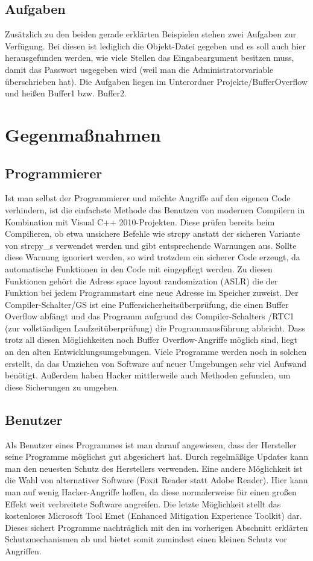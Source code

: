 \subsection{Aufgaben}
Zusätzlich zu den beiden gerade erklärten Beispielen stehen zwei Aufgaben zur Verfügung. Bei diesen ist lediglich die Objekt-Datei gegeben und es soll auch hier herausgefunden werden, wie viele Stellen das Eingabeargument besitzen muss, damit das Passwort  usgegeben wird (weil man die Administratorvariable
überschrieben hat).
Die Aufgaben liegen im Unterordner Projekte/BufferOverflow und heißen Buffer1 bzw. Buffer2.

\section{Gegenmaßnahmen}

\subsection{Programmierer}
Ist man selbst der Programmierer und möchte Angriffe auf den eigenen Code verhindern, ist die einfachste Methode das Benutzen von modernen Compilern in Kombination mit Visual C++ 2010-Projekten.
Diese prüfen bereits beim Compilieren, ob etwa unsichere Befehle wie strcpy anstatt der sicheren Variante von strcpy\_s verwendet werden und gibt entsprechende Warnungen aus. 
Sollte diese Warnung ignoriert werden, so wird trotzdem ein sicherer Code erzeugt, da automatische Funktionen in den Code mit eingepflegt werden. 
Zu diesen Funktionen gehört die Adress space layout randomization (ASLR) die der Funktion bei jedem Programmstart eine neue Adresse im Speicher zuweist. 
Der Compiler-Schalter/GS ist eine Puffersicherheitsüberprüfung, die einen Buffer Overflow abfängt und das Programm aufgrund des Compiler-Schalters /RTC1 (zur vollständigen Laufzeitüberprüfung) die Programmausführung abbricht. 
Dass trotz all diesen Möglichkeiten noch Buffer Overflow-Angriffe möglich sind, liegt an den alten Entwicklungsumgebungen. 
Viele Programme werden noch in solchen erstellt, da das Umziehen von Software auf neuer Umgebungen sehr viel Aufwand benötigt. 
Außerdem haben Hacker mittlerweile auch Methoden gefunden, um diese Sicherungen zu umgehen.

\subsection{Benutzer}

Als Benutzer eines Programmes ist man darauf angewiesen, dass der Hersteller seine Programme möglichst gut abgesichert hat. Durch regelmäßige Updates kann man den neuesten Schutz des Herstellers verwenden.
Eine andere Möglichkeit ist die Wahl von alternativer Software (Foxit Reader statt Adobe Reader). Hier kann man auf wenig Hacker-Angriffe hoffen, da diese normalerweise für einen großen Effekt weit verbreitete Software angreifen.
Die letzte Möglichkeit stellt das kostenloses Microsoft Tool Emet (Enhanced Mitigation Experience Toolkit) dar. Dieses sichert Programme nachträglich mit den im vorherigen Abschnitt erklärten Schutzmechanismen ab und bietet somit zumindest einen kleinen Schutz vor Angriffen.